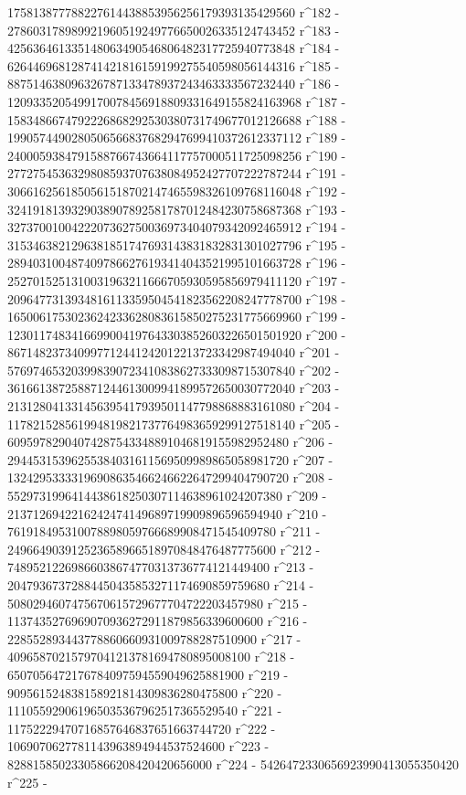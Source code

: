        175813877788227614438853956256179393135429560 r^182 - 
       278603178989921960519249776650026335124743452 r^183 - 
       425636461335148063490546806482317725940773848 r^184 - 
       626446968128741421816159199275540598056144316 r^185 - 
       887514638096326787133478937243463333567232440 r^186 - 
       1209335205499170078456918809331649155824163968 r^187 - 
       1583486674792226868292530380731749677012126688 r^188 - 
       1990574490280506566837682947699410372612337112 r^189 - 
       2400059384791588766743664117757000511725098256 r^190 - 
       2772754536329808593707638084952427707222787244 r^191 - 
       3066162561850561518702147465598326109768116048 r^192 - 
       3241918139329038907892581787012484230758687368 r^193 - 
       3273700100422207362750036973404079342092465912 r^194 - 
       3153463821296381851747693143831832831301027796 r^195 - 
       2894031004874097866276193414043521995101663728 r^196 - 
       2527015251310031963211666705930595856979411120 r^197 - 
       2096477313934816113359504541823562208247778700 r^198 - 
       1650061753023624233628083615850275231775669960 r^199 - 
       1230117483416699004197643303852603226501501920 r^200 - 
       867148237340997712441242012213723342987494040 r^201 - 
       576974653203998390723410838627333098715307840 r^202 - 
       361661387258871244613009941899572650030772040 r^203 - 
       213128041331456395417939501147798868883161080 r^204 - 
       117821528561994819821737764983659299127518140 r^205 - 
       60959782904074287543348891046819155982952480 r^206 - 
       29445315396255384031611569509989865058981720 r^207 - 
       13242953333196908635466246622647299404790720 r^208 - 
       5529731996414438618250307114638961024207380 r^209 - 
       2137126942216242474149689719909896596594940 r^210 - 
       761918495310078898059766689908471545409780 r^211 - 
       249664903912523658966518970848476487775600 r^212 - 
       74895212269866038674770313736774121449400 r^213 - 
       20479367372884450435853271174690859759680 r^214 - 
       5080294607475670615729677704722203457980 r^215 - 
       1137435276969070936272911879856339600600 r^216 - 
       228552893443778860660931009788287510900 r^217 - 
       40965870215797041213781694780895008100 r^218 - 
       6507056472176784097594559049625881900 r^219 - 
       909561524838158921814309836280475800 r^220 - 
       111055929061965035367962517365529540 r^221 - 
       11752229470716857646837651663744720 r^222 - 
       1069070627781143963894944537524600 r^223 - 
       82881585023305866208420420656000 r^224 - 
       5426472330656923990413055350420 r^225 - 
